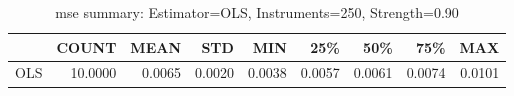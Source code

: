 \begin{table}[ht]
\centering
\caption{mse summary: Estimator=OLS, Instruments=250, Strength=0.90}
\begin{tabular}{lrrrrrrrr}
\toprule
 & COUNT & MEAN & STD & MIN & 25\% & 50\% & 75\% & MAX \\
\midrule
OLS & 10.0000 & 0.0065 & 0.0020 & 0.0038 & 0.0057 & 0.0061 & 0.0074 & 0.0101 \\
\bottomrule
\end{tabular}
\end{table}

